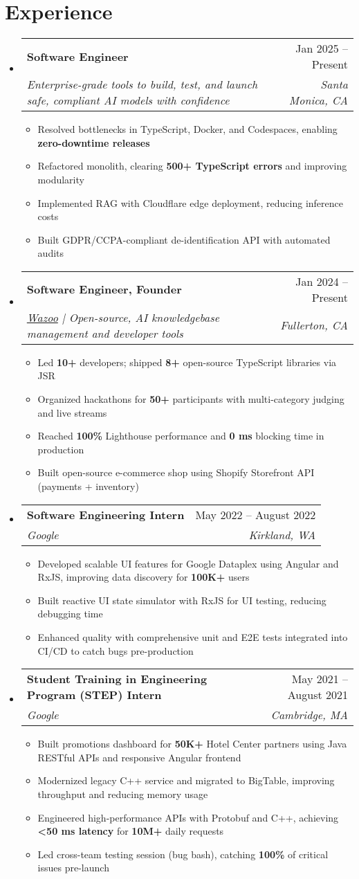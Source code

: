 \documentclass[letterpaper,11pt]{article}
\makeatletter
\newcommand{\resumeItem}[1]{
  \item\small{
    {#1 \vspace{-2pt}}
  }
}
\newcommand{\resumeSubheading}[4]{
  \vspace{-2pt}\item
    \begin{tabular*}{0.97\textwidth}[t]{l@{\extracolsep{\fill}}r}
      \textbf{#1} & #2 \\
      \textit{\small#3} & \textit{\small #4} \\
    \end{tabular*}\vspace{-2pt}
}
\newcommand{\resumeSubHeadingListStart}{\begin{itemize}[leftmargin=0.15in, label={}]}
\newcommand{\resumeSubHeadingListEnd}{\end{itemize}}
\newcommand{\resumeItemListStart}{\begin{itemize}}
\newcommand{\resumeItemListEnd}{\end{itemize}\vspace{-3pt}}
\makeatother
\begin{document}
\section{Experience}
\resumeSubHeadingListStart
  \resumeSubheading
    {Software Engineer}{Jan 2025 -- Present}
    {Enterprise-grade tools to build, test, and launch safe, compliant AI models with confidence}{Santa Monica, CA}
    \resumeItemListStart
      \resumeItem{Resolved bottlenecks in TypeScript, Docker, and Codespaces, enabling \textbf{zero-downtime releases}}
      \resumeItem{Refactored monolith, clearing \textbf{500+ TypeScript errors} and improving modularity}
      \resumeItem{Implemented RAG with Cloudflare edge deployment, reducing inference costs}
      \resumeItem{Built GDPR/CCPA-compliant de-identification API with automated audits}
    \resumeItemListEnd
  
  \resumeSubheading
    {Software Engineer, Founder}{Jan 2024 -- Present}
    {\href{https://wazoo.tech/}{Wazoo} | Open-source, AI knowledgebase management and developer tools}{Fullerton, CA}
    \resumeItemListStart
      \resumeItem{Led \textbf{10+} developers; shipped \textbf{8+} open-source TypeScript libraries via JSR}
      \resumeItem{Organized hackathons for \textbf{50+} participants with multi-category judging and live streams}
      \resumeItem{Reached \textbf{100\%} Lighthouse performance and \textbf{0 ms} blocking time in production}
      \resumeItem{Built open-source e-commerce shop using Shopify Storefront API (payments + inventory)}
    \resumeItemListEnd

  \resumeSubheading
    {Software Engineering Intern}{May 2022 -- August 2022}
    {Google}{Kirkland, WA}
    \resumeItemListStart
      \resumeItem{Developed scalable UI features for Google Dataplex using Angular and RxJS, improving data discovery for \textbf{100K+} users}
      \resumeItem{Built reactive UI state simulator with RxJS for UI testing, reducing debugging time}
      \resumeItem{Enhanced quality with comprehensive unit and E2E tests integrated into CI/CD to catch bugs pre-production}
    \resumeItemListEnd

  \resumeSubheading
    {Student Training in Engineering Program (STEP) Intern}{May 2021 -- August 2021}
    {Google}{Cambridge, MA}
    \resumeItemListStart
      \resumeItem{Built promotions dashboard for \textbf{50K+} Hotel Center partners using Java RESTful APIs and responsive Angular frontend}
      \resumeItem{Modernized legacy C++ service and migrated to BigTable, improving throughput and reducing memory usage}
      \resumeItem{Engineered high-performance APIs with Protobuf and C++, achieving \textbf{<50 ms latency} for \textbf{10M+} daily requests}
      \resumeItem{Led cross-team testing session (bug bash), catching \textbf{100\%} of critical issues pre-launch}
    \resumeItemListEnd
\resumeSubHeadingListEnd
\end{document}
